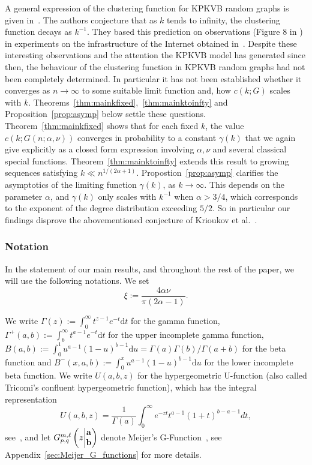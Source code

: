 A general expression of the clustering function for KPKVB random graphs is given in~\cite[Equation (59)]{krioukov2010hyperbolic}. 
The authors conjecture that as $k$ tends to infinity, the clustering function decays as $k^{-1}$. They based this prediction 
on observations (Figure 8 in \cite{krioukov2010hyperbolic}) in experiments on the infrastructure of the Internet obtained 
in~\cite{claffy2009internet}. 
Despite these interesting observations and the attention
the KPKVB model has generated since then, the behaviour of the clustering function in 
KPKVB random graphs had not been completely determined. In particular it has not been established whether it converges as $n\to\infty$ to some suitable limit function and, 
how $c(k;G)$ scales with $k$.
Theorems~\ref{thm:mainkfixed},~\ref{thm:mainktoinfty} and Proposition~\ref{prop:asymp} below settle these questions.
Theorem~\ref{thm:mainkfixed} shows that for each fixed $k$, the value $c(k;G(n;\alpha,\nu))$ converges in probability to 
a constant $\gamma(k)$ that we again give explicitly as a closed form expression involving $\alpha,\nu$ and several classical special functions.
Theorem~\ref{thm:mainktoinfty} extends this result to growing sequences satisfying $k \ll n^{1/(2\alpha+1)}$.
Propostion~\ref{prop:asymp} clarifies the asymptotics of the limiting function $\gamma(k)$, as $k\to\infty$.
This depends on the parameter $\alpha$, and $\gamma(k)$ only scales with $k^{-1}$ when $\alpha > 3/4$, 
which corresponds to the exponent of the degree distribution exceeding $5/2$. 
So in particular our findings disprove the abovementioned conjecture of Krioukov et al.~\cite{krioukov2010hyperbolic}.


\subsubsection*{Notation}

In the statement of our main results, and throughout the rest of the paper, we will use the following notations. 
We set 
$$\xi := \frac{4\alpha\nu}{\pi(2\alpha-1)}. $$

We write $\Gamma(z) := \int_0^\infty t^{z-1} e^{-t}\text{d}t$ for the gamma function, 
$\Gamma^+(a,b) := \int_b^\infty t^{a-1} e^{-t}\text{d}t$ for the upper incomplete gamma function, 
 $B(a,b) := \int_0^1 u^{a-1}(1-u)^{b-1}\text{d}u = \Gamma(a)\Gamma(b) / \Gamma(a+b)$ for the beta function and 
 $B^-(x,a,b) := \int_0^x u^{a-1}(1-u)^{b-1}\text{d}u$ for the lower incomplete beta function. 
We write $U(a,b,z)$ for the hypergeometric U-function (also called Tricomi's confluent hypergeometric function), which 
has the integral representation 
\[
	U(a,b,z) = \frac{1}{\Gamma(a)} \int_0^\infty e^{-zt} t^{a-1} (1+t)^{b-a-1} dt,
\] 
see~\cite[p.255 Equation (2)]{erdelyi1953higher}, and let $\MeijerGnew{m}{\ell}{p}{q}{{\bf a}}{{\bf b}}{z}$ denote 
Meijer's G-Function~\cite{meijer1946gfunction}, see Appendix~\ref{sec:Meijer_G_functions} for more details.

